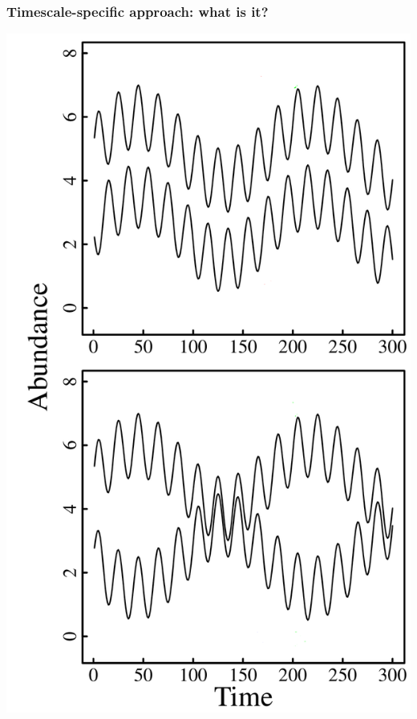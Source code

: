 \documentclass{beamer}
\begin{document}
\begin{frame}
\frametitle{Timescale-specific approach: what is it?}
\begin{center}
\includegraphics[height=.8\textheight]{figures/Cospectra_explanation.png}
\end{center}
\end{frame}
\end{document}
